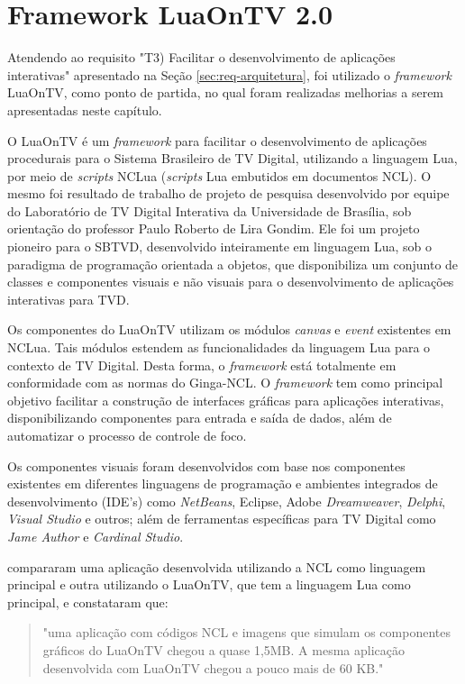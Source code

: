\chapter{Framework LuaOnTV 2.0} \label{cap:luaontv}
Atendendo ao requisito "T3) Facilitar o desenvolvimento de aplicações interativas"  apresentado na Seção \ref{sec:req-arquitetura},
foi utilizado o \textit{framework} LuaOnTV, como ponto de partida, no qual foram realizadas melhorias a serem apresentadas neste capítulo.

O LuaOnTV\cite{junior2009luacomp} é um \textit{framework} para facilitar o desenvolvimento de aplicações procedurais
para o Sistema Brasileiro de TV Digital, utilizando a linguagem Lua, por meio
de \textit{scripts} NCLua (\textit{scripts} Lua embutidos em documentos NCL).
O mesmo foi resultado de trabalho de projeto de pesquisa desenvolvido por equipe do Laboratório de TV Digital Interativa da
Universidade de Brasília, sob orientação do professor Paulo Roberto de Lira Gondim. 
Ele foi um projeto pioneiro para o SBTVD, desenvolvido inteiramente em linguagem Lua,
sob o paradigma de programação orientada a objetos, que disponibiliza um conjunto
de classes e componentes visuais e não visuais para o desenvolvimento
de aplicações interativas para TVD.

Os componentes do LuaOnTV utilizam os módulos \textit{canvas} e \textit{event} existentes em NCLua.
Tais módulos estendem as funcionalidades da linguagem Lua para o contexto de TV Digital.
Desta forma, o \textit{framework} está totalmente em conformidade com as normas do Ginga-NCL.
O \textit{framework} tem como principal objetivo facilitar a construção de interfaces gráficas
para aplicações interativas, disponibilizando componentes para entrada e saída de dados, 
além de automatizar o processo de controle de foco.

Os componentes visuais foram desenvolvidos com base nos componentes 
existentes em diferentes linguagens de programação e ambientes integrados de desenvolvimento (IDE's)
como \textit{NetBeans}, Eclipse, Adobe \textit{Dreamweaver}, \textit{Delphi}, \textit{Visual Studio} e outros; além de ferramentas
específicas para TV Digital como \textit{Jame Author} e \textit{Cardinal Studio}.

\cite{junior2009luacomp} compararam uma aplicação desenvolvida utilizando a NCL como linguagem principal e outra
utilizando o LuaOnTV, que tem a linguagem Lua como principal, e constataram que:

\begin{quote}
"uma aplicação com códigos NCL e imagens que simulam os componentes gráficos do LuaOnTV chegou a quase 1,5MB. A
mesma aplicação desenvolvida com LuaOnTV chegou a pouco mais de 60 KB."
\end{quote}

